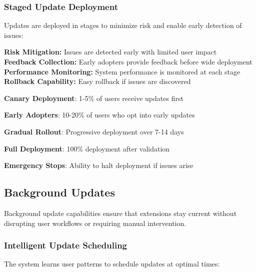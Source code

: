 \subsubsection{Staged Update Deployment}
\label{subsubsec:staged-update-deployment}

Updates are deployed in stages to minimize risk and enable early detection of issues:

\begin{infobox}[title=Staged Deployment Benefits]
\textbf{Risk Mitigation:} Issues are detected early with limited user impact \\
\textbf{Feedback Collection:} Early adopters provide feedback before wide deployment \\
\textbf{Performance Monitoring:} System performance is monitored at each stage \\
\textbf{Rollback Capability:} Easy rollback if issues are discovered
\end{infobox}

\begin{compactlist}
\item \textbf{Canary Deployment}: 1-5\% of users receive updates first
\item \textbf{Early Adopters}: 10-20\% of users who opt into early updates
\item \textbf{Gradual Rollout}: Progressive deployment over 7-14 days
\item \textbf{Full Deployment}: 100\% deployment after validation
\item \textbf{Emergency Stops}: Ability to halt deployment if issues arise
\end{compactlist}

\subsection{Background Updates}
\label{subsec:background-updates}

Background update capabilities ensure that extensions stay current without disrupting user workflows or requiring manual intervention.

\subsubsection{Intelligent Update Scheduling}
\label{subsubsec:intelligent-update-scheduling}

The system learns user patterns to schedule updates at optimal times:


